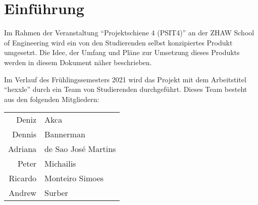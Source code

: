 \documentclass[../main.tex]{subfiles}
\begin{document}
	\section{Einführung}
	\par Im Rahmen der Veranstaltung \enquote{Projektschiene 4 (PSIT4)} an der ZHAW School of Engineering wird ein von den Studierenden selbst konzipiertes Produkt umgesetzt. Die Idee, der Umfang und Pläne zur Umsetzung dieses Produkts werden in diesem Dokument näher beschrieben.
	\par Im Verlauf des Frühlingssemesters 2021 wird das Projekt mit dem Arbeitstitel \enquote{\gls{hexxle}} durch ein Team von Studierenden durchgeführt. Dieses Team besteht aus den folgenden Mitgliedern:
	\begin{table}[H]
		\centering
		\begin{tabular}{rl}
			Deniz   & Akca                \\
			Dennis  & Bannerman           \\
			Adriana & de Sao José Martins \\
			Peter   & Michailis           \\
			Ricardo & Monteiro Simoes     \\
			Andrew  & Surber             
		\end{tabular}
	\end{table}
	
\end{document}
